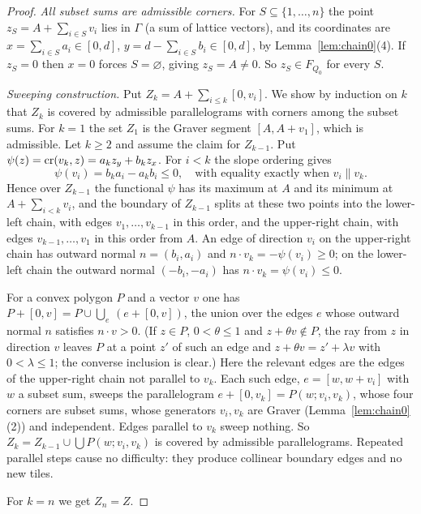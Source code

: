 \begin{proof}
\emph{All subset sums are admissible corners.} For $S\subseteq\{1,\dots,n\}$ the point $z_S=A+\sum_{i\in S}v_i$ lies in $\Gamma$ (a sum of lattice vectors), and its coordinates are $x=\sum_{i\in S}a_i\in[0,d]$, $y=d-\sum_{i\in S}b_i\in[0,d]$, by Lemma~\ref{lem:chain0}(4). If $z_S=0$ then $x=0$ forces $S=\varnothing$, giving $z_S=A\ne0$. So $z_S\in F_{Q_0}$ for every $S$.

\emph{Sweeping construction.} Put $Z_k=A+\sum_{i\le k}[0,v_i]$. We show by induction on $k$ that $Z_k$ is covered by admissible parallelograms with corners among the subset sums. For $k=1$ the set $Z_1$ is the Graver segment $[A,A+v_1]$, which is admissible. Let $k\ge2$ and assume the claim for $Z_{k-1}$. Put $\psi(z)=\operatorname{cr}(v_k,z)=a_kz_y+b_kz_x$. For $i<k$ the slope ordering gives
\[
  \psi(v_i)=b_ka_i-a_kb_i\le0,\quad\text{with equality exactly when }v_i\parallel v_k.
\]
Hence over $Z_{k-1}$ the functional $\psi$ has its maximum at $A$ and its minimum at $A+\sum_{i<k}v_i$, and the boundary of $Z_{k-1}$ splits at these two points into the lower-left chain, with edges $v_1,\dots,v_{k-1}$ in this order, and the upper-right chain, with edges $v_{k-1},\dots,v_1$ in this order from $A$. An edge of direction $v_i$ on the upper-right chain has outward normal $n=(b_i,a_i)$ and $n\cdot v_k=-\psi(v_i)\ge0$; on the lower-left chain the outward normal $(-b_i,-a_i)$ has $n\cdot v_k=\psi(v_i)\le0$.

For a convex polygon $P$ and a vector $v$ one has $P+[0,v]=P\cup\bigcup_e\,(e+[0,v])$, the union over the edges $e$ whose outward normal $n$ satisfies $n\cdot v>0$. (If $z\in P$, $0<\theta\le1$ and $z+\theta v\notin P$, the ray from $z$ in direction $v$ leaves $P$ at a point $z'$ of such an edge and $z+\theta v=z'+\lambda v$ with $0<\lambda\le1$; the converse inclusion is clear.) Here the relevant edges are the edges of the upper-right chain not parallel to $v_k$. Each such edge, $e=[w,w+v_i]$ with $w$ a subset sum, sweeps the parallelogram $e+[0,v_k]=P(w;v_i,v_k)$, whose four corners are subset sums, whose generators $v_i,v_k$ are Graver (Lemma~\ref{lem:chain0}(2)) and independent. Edges parallel to $v_k$ sweep nothing. So $Z_k=Z_{k-1}\cup\bigcup P(w;v_i,v_k)$ is covered by admissible parallelograms. Repeated parallel steps cause no difficulty: they produce collinear boundary edges and no new tiles.

For $k=n$ we get $Z_n=Z$.
\end{proof}

